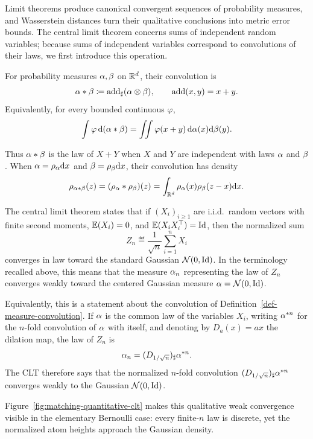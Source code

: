 Limit theorems produce canonical convergent sequences of probability measures, and Wasserstein distances turn their qualitative conclusions into metric error bounds. The central limit theorem concerns sums of independent random variables; because sums of independent variables correspond to convolutions of their laws, we first introduce this operation.
\begin{defn}\label{def-measure-convolution}
	For probability measures $\alpha,\beta$ on $\mathbb{R}^d$, their convolution is
	\[
		\alpha*\beta\coloneqq\operatorname{add}_\sharp(\alpha\otimes\beta),
		\qquad \operatorname{add}(x,y)=x+y.
	\]
	Equivalently, for every bounded continuous $\varphi$,
	\[
		\int\varphi\,\mathrm{d}(\alpha*\beta)
		=
		\iint\varphi(x+y)\,\mathrm{d}\alpha(x)\mathrm{d}\beta(y).
	\]
\end{defn}
Thus $\alpha*\beta$ is the law of $X+Y$ when $X$ and $Y$ are independent with laws $\alpha$ and $\beta$. When $\alpha=\rho_{\alpha}\mathrm{d} x$ and $\beta=\rho_{\beta}\mathrm{d} x$, their convolution has density
\[
	\rho_{\alpha*\beta}(z)
	=
	(\rho_{\alpha}*\rho_{\beta})(z)
	=
	\int_{\mathbb{R}^d}\rho_{\alpha}(x)\rho_{\beta}(z-x)\mathrm{d} x.
\]

\begin{rem}\label{rem-clt}
	The central limit theorem states that if $(X_i)_{i\geq1}$ are i.i.d.\ random vectors with finite second moments, $\mathbb{E}(X_i)=0$, and $\mathbb{E}(X_i X_i^\top)=\mathrm{Id}$, then the normalized sum
	\[
		Z_n \eqdef \frac{1}{\sqrt{n}} \sum_{i=1}^n X_i
	\]
	converges in law toward the standard Gaussian $\mathcal{N}(0,\mathrm{Id})$. In the terminology recalled above, this means that the measure $\alpha_n$ representing the law of $Z_n$ converges weakly toward the centered Gaussian measure $\alpha=\mathcal{N}(0,\mathrm{Id})$.

	Equivalently, this is a statement about the convolution of Definition~\ref{def-measure-convolution}.
	If $\alpha$ is the common law of the variables $X_i$, writing $\alpha^{*n}$ for the $n$-fold convolution of $\alpha$ with itself, and denoting by $D_a(x)=a x$ the dilation map, the law of $Z_n$ is
	\[
		\alpha_n=(D_{1/\sqrt n})_\sharp\alpha^{*n}.
	\]
	The CLT therefore says that the normalized $n$-fold convolution $(D_{1/\sqrt n})_\sharp\alpha^{*n}$ converges weakly to the Gaussian $\mathcal{N}(0,\mathrm{Id})$.
\end{rem}

Figure~\ref{fig:matching-quantitative-clt} makes this qualitative weak convergence visible in the elementary Bernoulli case: every finite-$n$ law is discrete, yet the normalized atom heights approach the Gaussian density.


